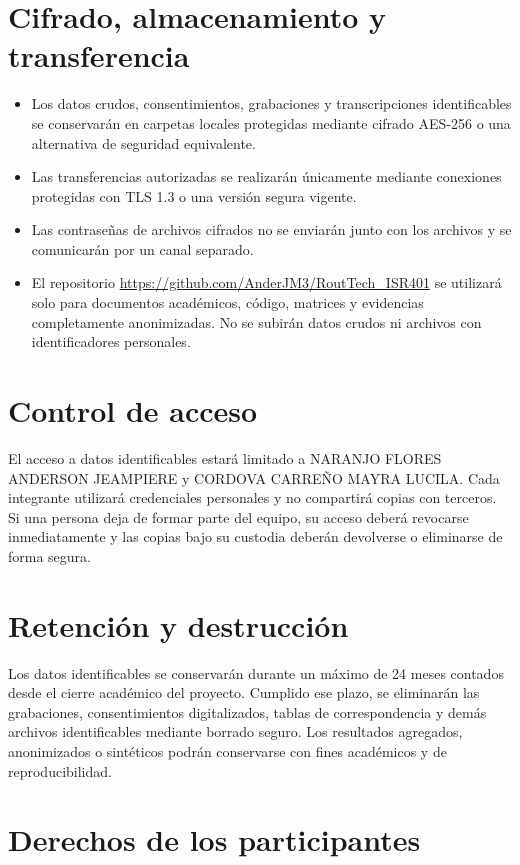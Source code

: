 \documentclass[10pt,a4paper]{article}
\newcommand{\Repositorio}{https://github.com/AnderJM3/RoutTech_ISR401}
\newcommand{\Anderson}{NARANJO FLORES ANDERSON JEAMPIERE}
\newcommand{\Mayra}{CORDOVA CARREÑO MAYRA LUCILA}
\begin{document}
\section{Cifrado, almacenamiento y transferencia}

\begin{itemize}
  \item Los datos crudos, consentimientos, grabaciones y transcripciones identificables se conservarán en carpetas locales protegidas mediante cifrado AES-256 o una alternativa de seguridad equivalente.
  \item Las transferencias autorizadas se realizarán únicamente mediante conexiones protegidas con TLS 1.3 o una versión segura vigente.
  \item Las contraseñas de archivos cifrados no se enviarán junto con los archivos y se comunicarán por un canal separado.
  \item El repositorio \url{\Repositorio} se utilizará solo para documentos académicos, código, matrices y evidencias completamente anonimizadas. No se subirán datos crudos ni archivos con identificadores personales.
\end{itemize}

\section{Control de acceso}

El acceso a datos identificables estará limitado a \Anderson{} y \Mayra{}. Cada integrante utilizará credenciales personales y no compartirá copias con terceros. Si una persona deja de formar parte del equipo, su acceso deberá revocarse inmediatamente y las copias bajo su custodia deberán devolverse o eliminarse de forma segura.

\section{Retención y destrucción}

Los datos identificables se conservarán durante un máximo de 24 meses contados desde el cierre académico del proyecto. Cumplido ese plazo, se eliminarán las grabaciones, consentimientos digitalizados, tablas de correspondencia y demás archivos identificables mediante borrado seguro. Los resultados agregados, anonimizados o sintéticos podrán conservarse con fines académicos y de reproducibilidad.

\section{Derechos de los participantes}
\end{document}
